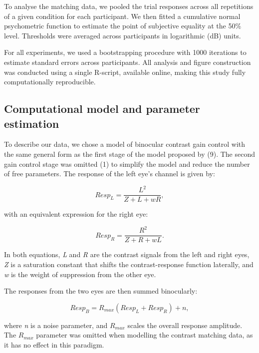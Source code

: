 \documentclass[
]{article}
\begin{document}
To analyse the matching data, we pooled the trial responses across all repetitions of a given condition for each participant. We then fitted a cumulative normal psychometric function to estimate the point of subjective equality at the 50\% level. Thresholds were averaged across participants in logarithmic (dB) units.

For all experiments, we used a bootstrapping procedure with 1000 iterations to estimate standard errors across participants. All analysis and figure construction was conducted using a single R-script, available online, making this study fully computationally reproducible.

\hypertarget{computational-model-and-parameter-estimation}{%
\subsection{Computational model and parameter estimation}\label{computational-model-and-parameter-estimation}}

To describe our data, we chose a model of binocular contrast gain control with the same general form as the first stage of the model proposed by (9). The second gain control stage was omitted (1) to simplify the model and reduce the number of free parameters. The response of the left eye's channel is given by:

\begin{equation}
\label{eq:respL}
Resp_L = \frac{L^2}{Z + L + wR},
\end{equation}

with an equivalent expression for the right eye:

\begin{equation}
\label{eq:respR}
Resp_R = \frac{R^2}{Z + R + wL}.
\end{equation}

In both equations, \emph{L} and \emph{R} are the contrast signals from the left and right eyes, \emph{Z} is a saturation constant that shifts the contrast-response function laterally, and \emph{w} is the weight of suppression from the other eye.

The responses from the two eyes are then summed binocularly:

\begin{equation}
\label{eq:respB}
Resp_B = R_{max}(Resp_L + Resp_R) + n,
\end{equation}

where \emph{n} is a noise parameter, and \(R_{max}\) scales the overall response amplitude. The \(R_{max}\) parameter was omitted when modelling the contrast matching data, as it has no effect in this paradigm.
\end{document}
